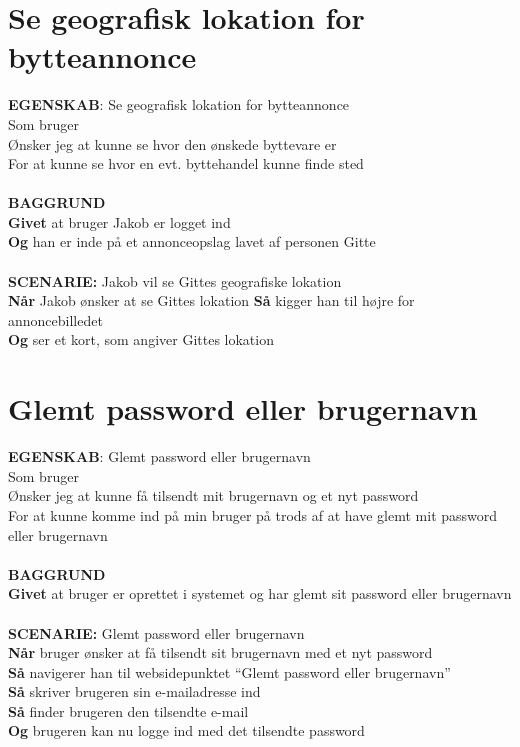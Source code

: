 \section{Se geografisk lokation for bytteannonce}
{\color{blue}\textbf{EGENSKAB}:} Se geografisk lokation for bytteannonce \\
Som bruger \\
Ønsker jeg at kunne se hvor den ønskede byttevare er \\
For at kunne se hvor en evt. byttehandel kunne finde sted\\ \\
{\color{blue}\textbf{BAGGRUND}} \\
{\color{blue}\textbf{Givet}} at bruger Jakob er logget ind \\
{\color{blue}\textbf{Og}} han er inde på et annonceopslag lavet af personen Gitte\\\\
{\color{blue}\textbf{SCENARIE:}} Jakob vil se Gittes geografiske lokation \\
{\color{blue}\textbf{Når}} Jakob ønsker at se Gittes lokation
{\color{blue}\textbf{Så}} kigger han til højre for annoncebilledet \\
{\color{blue}\textbf{Og}} ser et kort, som angiver Gittes lokation

\section{Glemt password eller brugernavn}
{\color{blue}\textbf{EGENSKAB}:} Glemt password eller brugernavn \\
Som bruger \\
Ønsker jeg at kunne få tilsendt mit brugernavn og et nyt password \\
For at kunne komme ind på min bruger på trods af at have glemt mit password eller brugernavn\\ \\
{\color{blue}\textbf{BAGGRUND}} \\
{\color{blue}\textbf{Givet}} at bruger er oprettet i systemet og har glemt sit password eller brugernavn \\
 \\
{\color{blue}\textbf{SCENARIE:}} Glemt password eller brugernavn \\
{\color{blue}\textbf{Når}} bruger ønsker at få tilsendt sit brugernavn med et nyt password \\
{\color{blue}\textbf{Så}} navigerer han til websidepunktet  “Glemt password eller brugernavn” \\
{\color{blue}\textbf{Så}} skriver brugeren sin e-mailadresse ind\\
{\color{blue}\textbf{Så}} finder brugeren den tilsendte e-mail \\
{\color{blue}\textbf{Og}} brugeren kan nu logge ind med det tilsendte password

